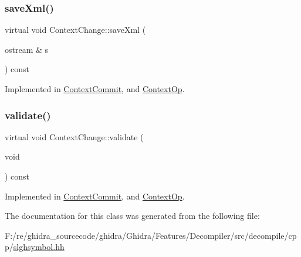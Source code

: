 \mbox{\label{class_context_change_a9874429eee192c35909a130dfdbbc83d}} 
\subsubsection{\texorpdfstring{saveXml()}{saveXml()}}
{\footnotesize\ttfamily virtual void Context\+Change\+::save\+Xml (\begin{DoxyParamCaption}\item[{ostream \&}]{s }\end{DoxyParamCaption}) const\hspace{0.3cm}{\ttfamily [pure virtual]}}



Implemented in \mbox{\hyperlink{class_context_commit_a38e0c54f39dba0542a8433401980d78e}{Context\+Commit}}, and \mbox{\hyperlink{class_context_op_ab0ddc8b720a9958f4dff5dae7f6cd288}{Context\+Op}}.

\mbox{\label{class_context_change_a9a9263347e16d2e396e3963a43eb7ea8}} 
\subsubsection{\texorpdfstring{validate()}{validate()}}
{\footnotesize\ttfamily virtual void Context\+Change\+::validate (\begin{DoxyParamCaption}\item[{void}]{ }\end{DoxyParamCaption}) const\hspace{0.3cm}{\ttfamily [pure virtual]}}



Implemented in \mbox{\hyperlink{class_context_commit_a11c0204a16fbbb69fedf147aebde173c}{Context\+Commit}}, and \mbox{\hyperlink{class_context_op_af3861ab0ca59793e1ed5d361fce4eb34}{Context\+Op}}.



The documentation for this class was generated from the following file\+:\begin{DoxyCompactItemize}
\item 
F\+:/re/ghidra\+\_\+sourcecode/ghidra/\+Ghidra/\+Features/\+Decompiler/src/decompile/cpp/\mbox{\hyperlink{slghsymbol_8hh}{slghsymbol.\+hh}}\end{DoxyCompactItemize}
